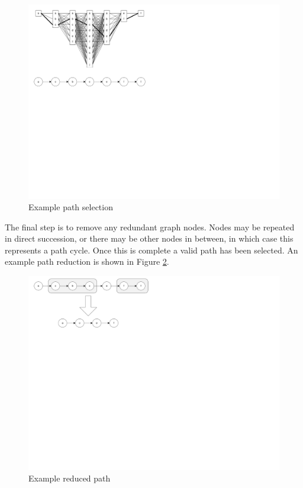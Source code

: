 \begin{figure}[ptb]
	\begin{centering}
		\includegraphics{Routing/Figures/routing-example_path_selection.pdf}
		\caption{Example path selection}
		\label{fig:routing:example_path_selection}
	\end{centering}
\end{figure}

The final step is to remove any redundant graph nodes. Nodes may be repeated in direct succession, or there may be other nodes in between, in which case this represents a path cycle. Once this is complete a valid path has been selected. An example path reduction is shown in Figure \ref{fig:routing:example_path_reduction}.

\begin{figure}[ptb]
	\begin{centering}
		\includegraphics{Routing/Figures/routing-example_path_reduction.pdf}
		\caption{Example reduced path}
		\label{fig:routing:example_path_reduction}
	\end{centering}
\end{figure}

